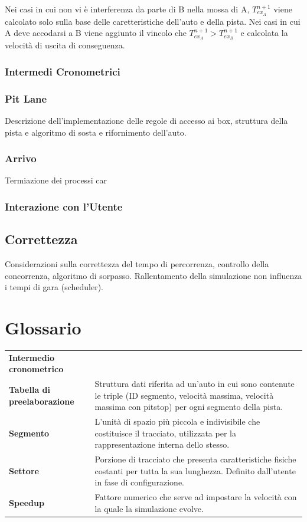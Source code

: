 \documentclass[11pt,a4paper]{report}
\newcommand{\term}[2]{\textbf{#1} & #2 \\}
\begin{document}
Nei casi in cui non vi è interferenza da parte di B nella mossa di A, $T_{ex_A}^{n+1}$ viene calcolato solo sulla base delle caretteristiche dell'auto e della pista.
Nei casi in cui A deve accodarsi a B viene aggiunto il vincolo che $T_{ex_A}^{n+1} > T_{ex_B}^{n+1}$ e calcolata la velocità di uscita di conseguenza.
\subsection{Intermedi Cronometrici}
\subsection{Pit Lane}
Descrizione dell'implementazione delle regole di accesso ai box, struttura della pista e algoritmo di sosta e rifornimento dell'auto.
\subsection{Arrivo}
Termiazione dei processi car
\subsection{Interazione con l'Utente}

\section{Correttezza}
Considerazioni sulla correttezza del tempo di percorrenza, controllo della concorrenza, algoritmo di sorpasso.
Rallentamento della simulazione non influenza i tempi di gara (scheduler).
\appendix

\chapter{Glossario}

\begin{tabularx}{\textwidth}{lX}
\term{Intermedio cronometrico}{}
\term{Tabella di preelaborazione}{Struttura dati riferita ad un'auto in cui sono contenute le triple (ID segmento, velocità massima, velocità massima con pitstop) per ogni segmento della pista.}
\term{Segmento}{L'unità di spazio più piccola e indivisibile che costituisce il tracciato, utilizzata per la rappresentazione interna dello stesso.}
\term{Settore}{Porzione di tracciato che presenta caratteristiche fisiche costanti per tutta la sua lunghezza. Definito dall'utente in fase di configurazione.}
\term{Speedup}{Fattore numerico che serve ad impostare la velocità con la quale la simulazione evolve.}
\end{tabularx}
\end{document}
